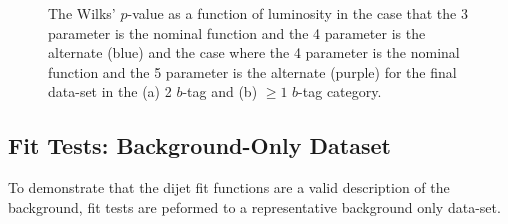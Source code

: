 \begin{figure}[!ht]
  \begin{center}
    \captionsetup[subfigure]{aboveskip=0pt,justification=centering}
  \end{center}
  \caption{The Wilks' $p$-value as a function of luminosity
    in the case that the 3 parameter is the nominal function and the 4 parameter is the alternate (blue)
    and the case where the 4 parameter is the nominal function and the 5 parameter is the alternate (purple)
    for the final data-set in the (a) 2 $b$-tag and (b) $\geq1$ $b$-tag category.
  }
  \label{fig:bkg-summer-wilks}
\end{figure}

\subsection{Fit Tests: Background-Only Dataset}
\label{sec:bkg-summer_fitCR}

To demonstrate that the dijet fit functions are a valid description of the background,
fit tests are peformed to a representative background only data-set.

